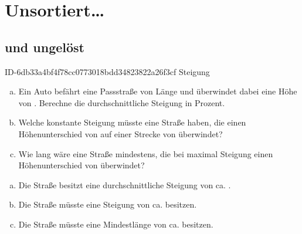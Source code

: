 \allowdisplaybreaks
\setcounter{chapter}{-1}
\chapter{Unsortiert\ldots}

\section{und ungelöst}

\begin{exercise}
      {ID-6db33a4bf4f78cc0773018bdd34823822a26f3cf}
      {Steigung}
  \ifproblem\problem
    \begin{enumerate}[a)]
      \item Ein Auto befährt eine Passstraße von  Länge und überwindet
            dabei eine Höhe von . Berechne die durchschnittliche
            Steigung in Prozent.
      \item Welche konstante Steigung müsste eine Straße haben, die einen
            Höhenunterschied von  auf einer Strecke von
             überwindet?
      \item Wie lang wäre eine Straße mindestens, die bei maximal 
            Steigung einen Höhenunterschied von  überwindet?
    \end{enumerate}
  \fi
  \ifoutline\outline
  \fi
  \ifoutcome\outcome
    \begin{enumerate}[a)]
      \item Die Straße besitzt eine durchschnittliche Steigung von ca. .
      \item Die Straße müsste eine Steigung von ca.  besitzen.
      \item Die Straße müsste eine Mindestlänge von ca.  besitzen.
    \end{enumerate}
  \fi
\end{exercise}

